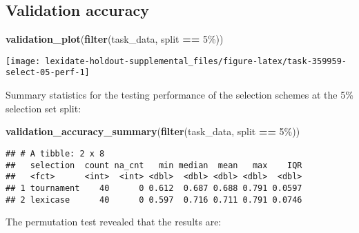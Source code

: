 \documentclass[
]{book}
\newenvironment{Shaded}{\begin{snugshade}}{\end{snugshade}}
\newcommand{\AttributeTok}[1]{\textcolor[rgb]{0.13,0.29,0.53}{#1}}
\newcommand{\DecValTok}[1]{\textcolor[rgb]{0.00,0.00,0.81}{#1}}
\newcommand{\FunctionTok}[1]{\textcolor[rgb]{0.13,0.29,0.53}{\textbf{#1}}}
\newcommand{\NormalTok}[1]{#1}
\newcommand{\OtherTok}[1]{\textcolor[rgb]{0.56,0.35,0.01}{#1}}
\newcommand{\SpecialCharTok}[1]{\textcolor[rgb]{0.81,0.36,0.00}{\textbf{#1}}}
\newcommand{\StringTok}[1]{\textcolor[rgb]{0.31,0.60,0.02}{#1}}
\begin{document}
\hypertarget{validation-accuracy-35}{%
\subsection{Validation accuracy}\label{validation-accuracy-35}}

\begin{Shaded}
\begin{Highlighting}[]
\FunctionTok{validation\_plot}\NormalTok{(}\FunctionTok{filter}\NormalTok{(task\_data, split }\SpecialCharTok{==} \StringTok{\textquotesingle{}5\%\textquotesingle{}}\NormalTok{))}
\end{Highlighting}
\end{Shaded}

\texttt{[image: lexidate-holdout-supplemental\_files/figure-latex/task-359959-select-05-perf-1]}

Summary statistics for the testing performance of the selection schemes at the 5\% selection set split:

\begin{Shaded}
\begin{Highlighting}[]
\FunctionTok{validation\_accuracy\_summary}\NormalTok{(}\FunctionTok{filter}\NormalTok{(task\_data, split }\SpecialCharTok{==} \StringTok{\textquotesingle{}5\%\textquotesingle{}}\NormalTok{))}
\end{Highlighting}
\end{Shaded}

\begin{verbatim}
## # A tibble: 2 x 8
##   selection  count na_cnt   min median  mean   max    IQR
##   <fct>      <int>  <int> <dbl>  <dbl> <dbl> <dbl>  <dbl>
## 1 tournament    40      0 0.612  0.687 0.688 0.791 0.0597
## 2 lexicase      40      0 0.597  0.716 0.711 0.791 0.0746
\end{verbatim}

The permutation test revealed that the results are:

\begin{Shaded}
\end{Shaded}
\end{document}

